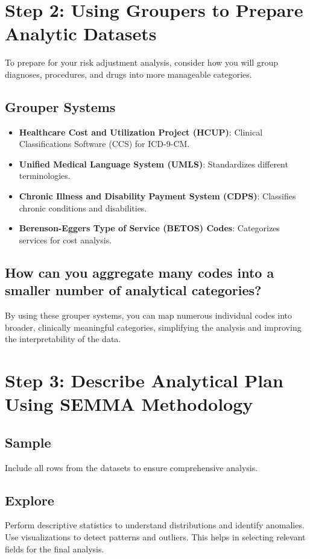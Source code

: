 \documentclass{article}
\begin{document}
\section*{Step 2: Using Groupers to Prepare Analytic Datasets}

To prepare for your risk adjustment analysis, consider how you will group diagnoses, procedures, and drugs into more manageable categories.

\subsection*{Grouper Systems}
\begin{itemize}
    \item \textbf{Healthcare Cost and Utilization Project (HCUP)}: Clinical Classifications Software (CCS) for ICD-9-CM.
    \item \textbf{Unified Medical Language System (UMLS)}: Standardizes different terminologies.
    \item \textbf{Chronic Illness and Disability Payment System (CDPS)}: Classifies chronic conditions and disabilities.
    \item \textbf{Berenson-Eggers Type of Service (BETOS) Codes}: Categorizes services for cost analysis.
\end{itemize}

\subsection*{How can you aggregate many codes into a smaller number of analytical categories?}
By using these grouper systems, you can map numerous individual codes into broader, clinically meaningful categories, simplifying the analysis and improving the interpretability of the data.

\section*{Step 3: Describe Analytical Plan Using SEMMA Methodology}

\subsection*{Sample}
Include all rows from the datasets to ensure comprehensive analysis.

\subsection*{Explore}
Perform descriptive statistics to understand distributions and identify anomalies. Use visualizations to detect patterns and outliers. This helps in selecting relevant fields for the final analysis.
\end{document}
